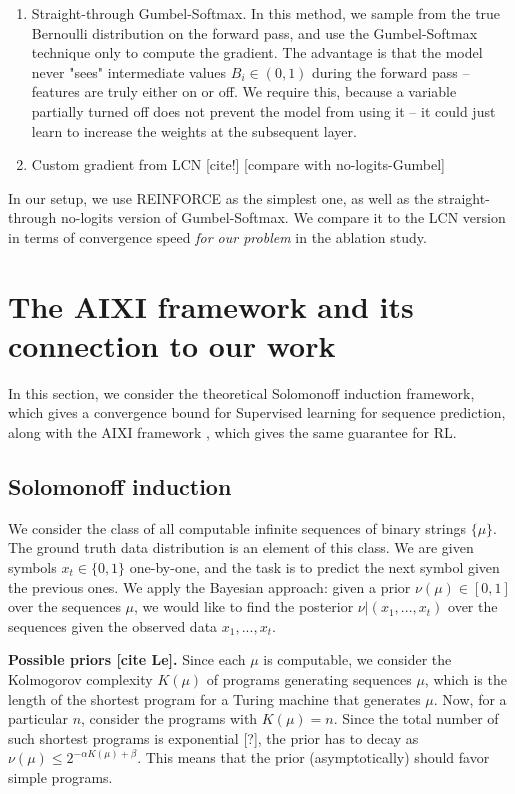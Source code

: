 \documentclass[a4paper,11pt,oneside]{report}
\begin{document}
\begin{enumerate}
    \item Straight-through Gumbel-Softmax. In this method, we sample from the true Bernoulli distribution on the forward pass, and use the Gumbel-Softmax technique only to compute the gradient. The advantage is that the model never "sees" intermediate values $B_i\in(0,1)$ during the forward pass -- features are truly either on or off. We require this, because a variable partially turned off does not prevent the model from using it -- it could just learn to increase the weights at the subsequent layer.
    \item Custom gradient from LCN [cite!] [compare with no-logits-Gumbel]
\end{enumerate}

In our setup, we use REINFORCE as the simplest one, as well as the straight-through no-logits version of Gumbel-Softmax. We compare it to the LCN version in terms of convergence speed {\em for our problem} in the ablation study.

\section{The AIXI framework and its connection to our work}
\label{sec:solomonoff_aixi}
In this section, we consider the theoretical Solomonoff induction framework, which gives a convergence bound for Supervised learning for sequence prediction, along with the AIXI framework \cite{Hutter2003,Veness2010}, which gives the same guarantee for RL.

\subsection{Solomonoff induction}
\label{subsec:solomonoff}
We consider the class of all computable infinite sequences of binary strings $\{\mu\}$. The ground truth data distribution is an element of this class. We are given symbols $x_t\in \{0,1\}$ one-by-one, and the task is to predict the next symbol given the previous ones. We apply the Bayesian approach: given a prior $\nu(\mu)\in[0,1]$ over the sequences $\mu$, we would like to find the posterior $\nu|(x_1,...,x_t)$ over the sequences given the observed data $x_1,...,x_t$.

{\bf Possible priors [cite Le].} Since each $\mu$ is computable, we consider the Kolmogorov complexity $K(\mu)$ of programs generating sequences $\mu$, which is the length of the shortest program for a Turing machine that generates $\mu$. Now, for a particular $n$, consider the programs with $K(\mu)=n$. Since the total number of such shortest programs is exponential [?], the prior has to decay as $\nu(\mu)\leq 2^{-\alpha K(\mu)+\beta}$. This means that the prior (asymptotically) should favor simple programs.
\end{document}

